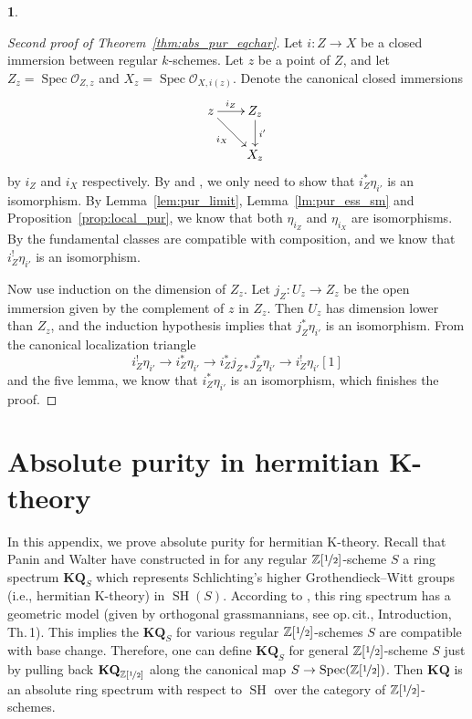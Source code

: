 \documentclass[11pt]{article}
\newcommand{\ie}{i.e.,\xspace}
\numberwithin{equation}{section}\renewcommand{\encodingdefault}{TU}
\newcommand{\KQ}{\mathbf{KQ}}
\DeclareMathOperator{\SH}{SH}
\DeclareMathOperator{\spec}{Spec}
\newcommand{\ZZot} {\mathbb Z[\nicefrac 1 2]}
\theoremstyle{remark}
\theoremstyle{definition}
\newtheorem{num}[thm]{}
\numberwithin{equation}{thm}
\begin{document}
\begin{num}
\begin{proof}[Second proof of Theorem~\ref{thm:abs_pur_eqchar}]
Let $i:Z\to X$ be a closed immersion between regular $k$-schemes. Let $z$ be a point of $Z$, and let $Z_z=\spec\mathcal{O}_{Z,z}$ and $X_z=\spec\mathcal{O}_{X,i(z)}$. Denote the canonical closed immersions
\[
\xymatrix@=.7cm{
z \ar[r]^-{i_Z} \ar[rd]_-{i_X} & Z_z \ar[d]^-{i'}\\
& X_z
}
\]
by $i_Z$ and $i_X$ respectively.
By \cite[Lem.\,4.3.17]{CD3} and \cite[Prop.\,4.3.9]{CD3}, we only need to show that $i_Z^*\eta_{i'}$ is an isomorphism. By Lemma~\ref{lem:pur_limit}, Lemma~\ref{lm:pur_ess_sm} and Proposition~\ref{prop:local_pur}, we know that both $\eta_{i_Z}$ and $\eta_{i_X}$ are isomorphisms. By \cite[Th.\,3.3.2]{DJK} the fundamental classes are compatible with composition, and we know that $i_Z^!\eta_{i'}$ is an isomorphism.

Now use induction on the dimension of $Z_z$. Let $j_Z:U_z\to Z_z$ be the open immersion given by the complement of $z$ in $Z_z$. Then $U_z$ has dimension lower than $Z_z$, and the induction hypothesis implies that $j_Z^*\eta_{i'}$ is an isomorphism. From the canonical localization triangle
\[
i_Z^!\eta_{i'}\to  i_Z^*\eta_{i'}\to  i_Z^*j_{Z*}j^*_Z\eta_{i'}\to i_Z^!\eta_{i'}[1]
\]
and the five lemma, we know that $i_Z^*\eta_{i'}$ is an isomorphism, which finishes the proof.
\end{proof}
\end{num}

\section{Absolute purity in hermitian K-theory}
\label{apd:hermitianK}

In this appendix, we prove absolute purity for hermitian K-theory.
Recall that Panin and Walter have constructed in \cite{PaninWalter1} for any regular $\ZZot$-scheme $S$
a ring spectrum $\KQ_S$ which represents Schlichting's higher Grothendieck--Witt groups (\ie hermitian K-theory)
in $\SH(S)$.
According to \cite{SchlichTri}, this ring spectrum has a geometric model
(given by orthogonal grassmannians, see op.\,cit., Introduction, Th.\,1).
This implies the $\KQ_S$ for various regular $\ZZot$-schemes $S$ are compatible with base change.
Therefore, one can define $\KQ_S$ for general $\ZZot$-scheme $S$ just by pulling back
$\KQ_{\ZZot}$ along the canonical map $S \to \spec(\ZZot)$.
Then $\KQ$ is an absolute ring spectrum with respect to $\SH$
over the category of $\ZZot$-schemes.
\end{document}

